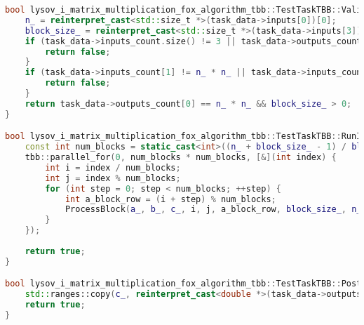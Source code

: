 \documentclass[12pt,a4paper]{extarticle}
\begin{document}
\begin{lstlisting}[language=C++]
bool lysov_i_matrix_multiplication_fox_algorithm_tbb::TestTaskTBB::ValidationImpl() {
	n_ = reinterpret_cast<std::size_t *>(task_data->inputs[0])[0];
	block_size_ = reinterpret_cast<std::size_t *>(task_data->inputs[3])[0];
	if (task_data->inputs_count.size() != 3 || task_data->outputs_count.size() != 1) {
		return false;
	}
	if (task_data->inputs_count[1] != n_ * n_ || task_data->inputs_count[0] != n_ * n_) {
		return false;
	}
	return task_data->outputs_count[0] == n_ * n_ && block_size_ > 0;
}

bool lysov_i_matrix_multiplication_fox_algorithm_tbb::TestTaskTBB::RunImpl() {
	const int num_blocks = static_cast<int>((n_ + block_size_ - 1) / block_size_);
	tbb::parallel_for(0, num_blocks * num_blocks, [&](int index) {
		int i = index / num_blocks;
		int j = index % num_blocks;
		for (int step = 0; step < num_blocks; ++step) {
			int a_block_row = (i + step) % num_blocks;
			ProcessBlock(a_, b_, c_, i, j, a_block_row, block_size_, n_);
		}
	});
	
	return true;
}

bool lysov_i_matrix_multiplication_fox_algorithm_tbb::TestTaskTBB::PostProcessingImpl() {
	std::ranges::copy(c_, reinterpret_cast<double *>(task_data->outputs[0]));
	return true;
}

\end{lstlisting}

\clearpage
{}
\end{document}
